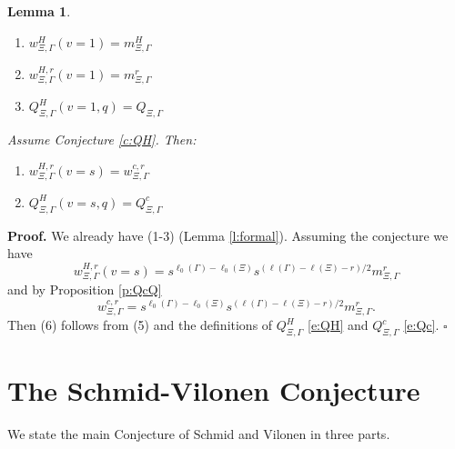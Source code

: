 \documentclass[12pt,leqno]{article}
\newtheorem{lemma}[equation]{Lemma}
\newcommand{\qed}{\hfill $\square$ \medskip}
\newenvironment{proof}[1][Proof]{\noindent\textbf{#1.} }{\qed}
\renewcommand{\sec}[1]{\section{#1}
\renewcommand{\theequation}{\thesection.\arabic{equation}}
  \setcounter{equation}{0}}
\renewcommand{\sec}[1]{\section{#1}
\renewcommand{\theequation}{\thesection.\arabic{equation}}
  \setcounter{equation}{0}}
\begin{document}
\begin{lemma}\hfil
\begin{enumerate}
\item $w^{H}_{\Xi,\Gamma}(v=1)=m^H_{\Xi,\Gamma}$
\item $w^{H,r}_{\Xi,\Gamma}(v=1)=m^{r}_{\Xi,\Gamma}$
\item $Q^H_{\Xi,\Gamma}(v=1,q)=Q_{\Xi,\Gamma}$
\end{enumerate}

Assume Conjecture \ref{c:QH}. Then:

\begin{enumerate}
\item[(5)] $w^{H,r}_{\Xi,\Gamma}(v=s)=w^{c,r}_{\Xi,\Gamma}$
\item[(6)] $Q^H_{\Xi,\Gamma}(v=s,q)=Q^c_{\Xi,\Gamma}$
\end{enumerate}
\end{lemma}

\begin{proof}
  We already have (1-3) (Lemma \ref{l:formal}). Assuming the conjecture we have
$$
w^{H,r}_{\Xi,\Gamma}(v=s)=s^{\ell_0(\Gamma)-\ell_0(\Xi)}s^{(\ell(\Gamma)-\ell(\Xi)-r)/2}m^r_{\Xi,\Gamma}
$$
and by Proposition \ref{p:QcQ}
$$
w^{c,r}_{\Xi,\Gamma}=s^{\ell_0(\Gamma)-\ell_0(\Xi)}s^{(\ell(\Gamma)-\ell(\Xi)-r)/2}m^r_{\Xi,\Gamma}.
$$
Then (6) follows from (5) and the definitions of $Q^H_{\Xi,\Gamma}$ \eqref{e:QH} and $Q^c_{\Xi,\Gamma}$ \eqref{e:Qc}.
\end{proof}


\sec{The Schmid-Vilonen Conjecture}
\label{s:svconjecture}
We state the main Conjecture of Schmid and Vilonen in three parts.
\end{document}
